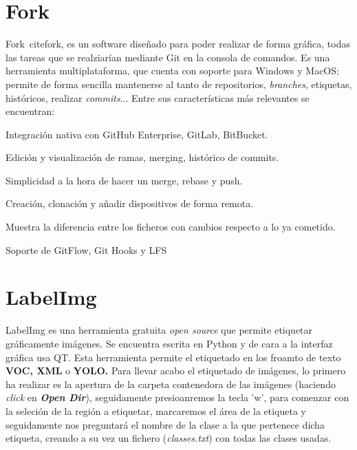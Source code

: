 \section{Fork}
Fork\ cite{fork}, es un software diseñado para poder realizar de forma gráfica, todas las tareas que se realziarían mediante Git en la consola de comandos.
Es una herramienta multiplataforma, que cuenta con soporte para Windows y MacOS; permite de forma sencilla mantenerse al tanto de repositorios, \textit{branches}, etiquetas, históricos, realizar \textit{commits}... Entre sus características más relevantes se encuentran:
\begin{list}{\textbullet}{ %
    \addtolength{\itemsep}{-2mm} %
    \setlength{\itemindent}{2mm}}

    \item Integración nativa con GitHub Enterprise, GitLab, BitBucket.
    \item Edición y visualización de ramas, merging, histórico de commits.
    \item Simplicidad a la hora de hacer un merge, rebase y push.
    \item Creación, clonación y añadir dispositivos de forma remota.
    \item Muestra la diferencia entre los ficheros con cambios respecto a lo ya cometido.
    \item Soporte de GitFlow, Git Hooks y LFS
\end{list}

\clearpage

\section{LabelImg}
LabelImg \cite{labelImg} es una herramienta gratuita \textit{open source} que permite etiquetar gráficamente imágenes. Se encuentra escrita en Python y de cara a la interfaz gráfica usa QT.
Esta herramienta permite el etiquetado en los froamto de texto \textbf{VOC, XML} o \textbf{YOLO.}
Para llevar acabo el etiquetado de imágenes, lo primero ha realizar es la apertura de la carpeta contenedora de las imágenes (haciendo \textit{click} en \textbf{\textit{Open Dir}}), seguidamente presioanremos la tecla 'w', para comenzar con la seleción de la región a etiquetar, marcaremos el área de la etiqueta y seguidamente nos preguntará el nombre de la clase a la que pertenece dicha etiqueta, creando a su vez un fichero (\textit{classes.txt}) con todas las clases usadas.


